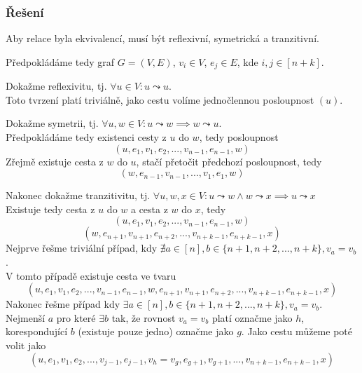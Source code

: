 \documentclass[../main.tex]{subfiles}
\begin{document}
\subsubsection*{Řešení}
Aby relace byla ekvivalencí, musí být reflexivní, symetrická a tranzitivní.

Předpokládáme tedy graf $G=(V,E)$, $v_i\in V$, $e_j\in E$, kde $i,j \in [n+k]$.

Dokažme reflexivitu, tj. $\forall u\in V: u\leadsto u$.\\
Toto tvrzení platí triviálně, jako cestu volíme jednočlennou posloupnost $(u)$.

Dokažme symetrii, tj. $\forall u,w\in V: u\leadsto w \implies w\leadsto u$.\\
Předpokládáme tedy existenci cesty z $u$ do $w$, tedy posloupnost 
\begin{equation*}
    (u, e_1, v_1, e_2, ..., v_{n-1}, e_{n-1}, w)
\end{equation*}
Zřejmě existuje cesta z $w$ do $u$, stačí přetočit předchozí posloupnost, tedy
\begin{equation*}
    (w, e_{n-1}, v_{n-1}, ..., v_1, e_1, w)
\end{equation*}

Nakonec dokažme tranzitivitu, tj. $\forall u,w,x\in V: u\leadsto w \wedge w\leadsto x \implies u\leadsto x$\\
Existuje tedy cesta z $u$ do $w$ a cesta z $w$ do $x$, tedy
\begin{equation*}
    (u, e_1, v_1, e_2, ..., v_{n-1}, e_{n-1}, w)
\end{equation*}
\begin{equation*}
    (w, e_{n+1}, v_{n+1}, e_{n+2}, ..., v_{n+k-1}, e_{n+k-1}, x)
\end{equation*}
Nejprve řešme triviální případ, kdy $\nexists a \in [n], b \in \{n+1, n+2, ..., n+k\}, v_a = v_b$ .\\
V tomto případě existuje cesta ve tvaru
\begin{equation*}
    (u, e_1, v_1, e_2, ..., v_{n-1}, e_{n-1}, w, e_{n+1}, v_{n+1}, e_{n+2}, ..., v_{n+k-1}, e_{n+k-1}, x)
\end{equation*} 
Nakonec řešme případ kdy $\exists a \in [n], b \in \{n+1, n+2, ..., n+k\}, v_a = v_b$.\\
Nejmenší $a$ pro které $\exists b$ tak, že rovnost $v_a = v_b$ platí označme jako $h$, korespondující $b$ (existuje pouze jedno) označme jako $g$.
Jako cestu můžeme poté volit jako
\begin{equation*}
    (u, e_1, v_1, e_2, ..., v_{j-1}, e_{j-1}, v_h = v_g , e_{g+1}, v_{g+1},..., v_{n+k-1}, e_{n+k-1}, x)
\end{equation*} 
\end{document}
